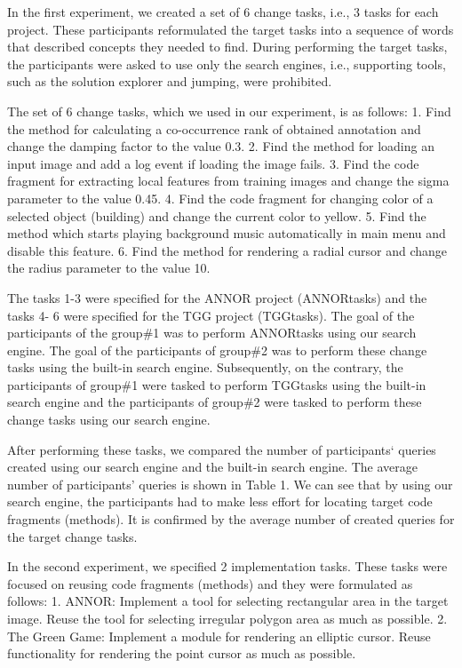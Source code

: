 \documentclass{llncs}
\begin{document}
In the first experiment, we created a set of 6 change tasks, i.e., 3 tasks for each project.
These participants reformulated the target tasks into a sequence of words that
described concepts they needed to find. During performing the target tasks, the participants
were asked to use only the search engines, i.e., supporting tools, such as the
solution explorer and jumping, were prohibited.

The set of 6 change tasks, which we used in our experiment, is as follows:
1. Find the method for calculating a co-occurrence rank of obtained annotation and
change the damping factor to the value 0.3. 2. Find the method for loading an input image and add a log event if loading the image
fails.
3. Find the code fragment for extracting local features from training images and
change the sigma parameter to the value 0.45.
4. Find the code fragment for changing color of a selected object (building) and
change the current color to yellow.
5. Find the method which starts playing background music automatically in main
menu and disable this feature.
6. Find the method for rendering a radial cursor and change the radius parameter to
the value 10.

The tasks 1-3 were specified for the ANNOR project (ANNORtasks) and the tasks 4-
6 were specified for the TGG project (TGGtasks). The goal of the participants of the
group\#1 was to perform ANNORtasks using our search engine. The goal of the participants
of group\#2 was to perform these change tasks using the built-in search engine.
Subsequently, on the contrary, the participants of group\#1 were tasked to perform
TGGtasks using the built-in search engine and the participants of group\#2 were tasked
to perform these change tasks using our search engine.

After performing these tasks, we compared the number of participants‘ queries created
using our search engine and the built-in search engine. The average number of
participants’ queries is shown in Table 1. We can see that by using our search engine,
the participants had to make less effort for locating target code fragments (methods).
It is confirmed by the average number of created queries for the target change tasks.

In the second experiment, we specified 2 implementation tasks. These tasks were
focused on reusing code fragments (methods) and they were formulated as follows:
1. ANNOR: Implement a tool for selecting rectangular area in the target image. Reuse
the tool for selecting irregular polygon area as much as possible.
2. The Green Game: Implement a module for rendering an elliptic cursor. Reuse
functionality for rendering the point cursor as much as possible.
\end{document}
